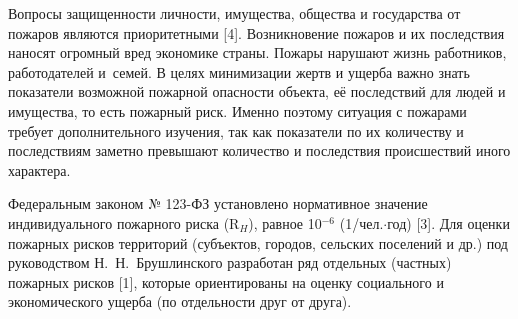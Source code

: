



\makeProcTitleII
{}

Вопросы защищенности личности, имущества, общества и государства от пожаров являются приоритетными [4]. Возникновение пожаров и их последствия наносят огромный вред экономике страны. Пожары нарушают жизнь работников, работодателей и семей. В целях минимизации жертв и ущерба важно знать показатели возможной пожарной опасности объекта, её последствий для людей и имущества, то есть пожарный риск. Именно поэтому ситуация с пожарами требует дополнительного изучения, так как показатели по их количеству и последствиям заметно превышают количество и последствия происшествий иного характера.

Федеральным законом № 123-ФЗ установлено нормативное значение индивидуального пожарного риска (R$_H$), равное 10$^{-6}$ (1/чел.$\cdot$год) [3]. Для оценки пожарных рисков территорий (субъектов, городов, сельских поселений и др.) под руководством Н.~Н.~Брушлинского разработан ряд отдельных (частных) пожарных рисков [1], которые ориентированы на оценку социального и экономического ущерба (по отдельности друг от друга).

